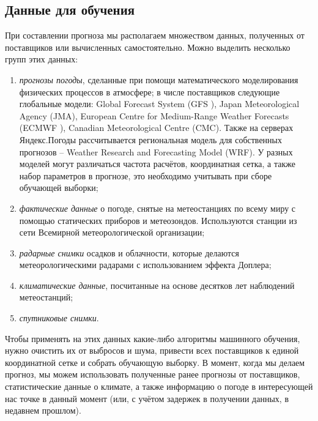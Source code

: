 \documentclass[14pt]{matmex-diploma}
\begin{document}
\subsection{Данные для обучения}
При составлении прогноза мы располагаем множеством данных, полученных от поставщиков или вычисленных самостоятельно. Можно выделить несколько групп этих данных:
\begin{enumerate}

    \item \textit{прогнозы погоды}, сделанные при помощи математического моделирования физических процессов в атмосфере; в числе поставщиков следующие глобальные модели: Global Forecast System (GFS \cite{saha2006ncep}), Japan Meteorological Agency (JMA), European Centre for Medium-Range Weather Forecasts (ECMWF \cite{persson2001user}), Canadian Meteorological Centre (CMC). Также на серверах Яндекс.Погоды рассчитывается региональная модель для собственных прогнозов -- Weather Research and Forecasting Model (WRF). У разных моделей могут различаться частота расчётов, координатная сетка, а также набор параметров в прогнозе, это необходимо учитывать при сборе обучающей выборки;

    \item \textit{фактические данные} о погоде, снятые на метеостанциях по всему миру с помощью статических приборов и метеозондов. Используются станции из сети Всемирной метеорологической организации;
    \item \textit{радарные снимки} осадков и облачности, которые делаются метеорологическими радарами с использованием эффекта Доплера\cite{doviak1993doppler};

    \item \textit{климатические данные}, посчитанные на основе десятков лет наблюдений метеостанций;

    \item \textit{спутниковые снимки}.
\end{enumerate}

Чтобы применять на этих данных какие-либо алгоритмы машинного обучения, нужно очистить их от выбросов и шума, привести всех поставщиков к единой координатной сетке и собрать обучающую выборку. В момент, когда мы делаем прогноз, мы можем использовать полученные ранее прогнозы от поставщиков, статистические данные о климате, а также информацию о погоде в интересующей нас точке в данный момент (или, с учётом задержек в получении данных, в недавнем прошлом).
\end{document}
